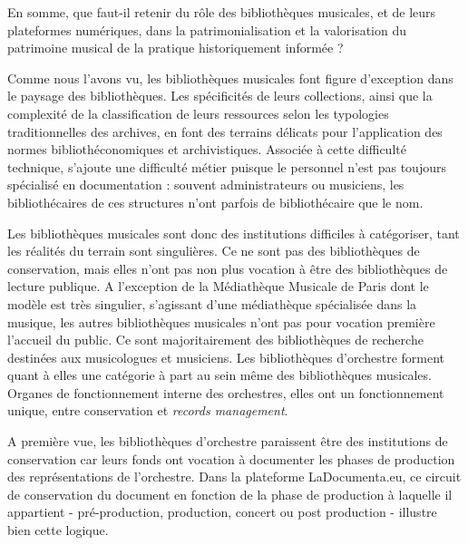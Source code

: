 En somme, que faut-il retenir du rôle des bibliothèques musicales, et de leurs plateformes numériques, dans la patrimonialisation et la valorisation du patrimoine musical de la pratique historiquement informée ?

Comme nous l'avons vu, les bibliothèques musicales font figure d'exception dans le paysage des bibliothèques. Les spécificités de leurs collections, ainsi que la complexité de la classification de leurs ressources selon les typologies traditionnelles des archives, en font des terrains délicats pour l'application des normes bibliothéconomiques et archivistiques. Associée à cette difficulté technique, s'ajoute une difficulté métier puisque le personnel n'est pas toujours spécialisé en documentation : souvent administrateurs ou musiciens, les bibliothécaires de ces structures n'ont parfois de bibliothécaire que le nom. 


Les bibliothèques musicales sont donc des institutions difficiles à catégoriser, tant les réalités du terrain sont singulières. Ce ne sont pas des bibliothèques de conservation, mais elles n'ont pas non plus vocation à être des bibliothèques de lecture publique. A l'exception de la Médiathèque Musicale de Paris dont le modèle est très singulier, s'agissant d'une médiathèque spécialisée dans la musique, les autres bibliothèques musicales n'ont pas pour vocation première l'accueil du public. Ce sont majoritairement des bibliothèques de recherche destinées aux musicologues et musiciens. 
Les bibliothèques d'orchestre forment quant à elles une catégorie à part au sein même des bibliothèques musicales. Organes de fonctionnement interne des orchestres, elles ont un fonctionnement unique, entre conservation et \textit{records management}. 


A première vue, les bibliothèques d'orchestre paraissent être des institutions de conservation car leurs fonds ont vocation à documenter les phases de production des représentations de l'orchestre. Dans la plateforme LaDocumenta.eu, ce circuit de conservation du document en fonction de la phase de production à laquelle il appartient - pré-production, production, concert ou post production - illustre bien cette logique.


